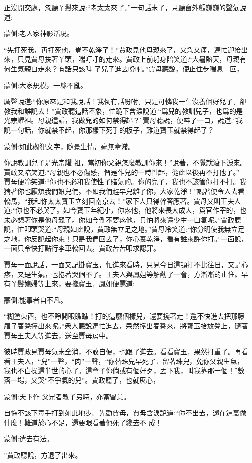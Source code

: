 \begin{parag}
    正沒開交處，忽聽丫鬟來說:“老太太來了。”一句話未了，只聽窗外顫巍巍的聲氣說道:\begin{note}蒙側:老人家神影活現。\end{note}“先打死我，再打死他，豈不乾淨了！”賈政見他母親來了，又急又痛，連忙迎接出來，只見賈母扶著丫頭，喘吁吁的走來。賈政上前躬身陪笑道:“大暑熱天，母親有何生氣親自走來？有話只該叫 了兒子進去吩咐。”賈母聽說，便止住步喘息一回，\begin{note}蒙側:大家規模，一絲不亂。\end{note}厲聲說道:“你原來是和我說話！我倒有話吩咐，只是可憐我一生沒養個好兒子，卻教我和誰說去！”賈政聽這話不象，忙跪下含淚說道:“爲兒的教訓兒子，也爲的是光宗耀祖。母親這話，我做兒的如何禁得起？”賈母聽說，便啐了一口，說道:“我說一句話，你就禁不起，你那樣下死手的板子，難道寶玉就禁得起了？\begin{note}蒙側:如此礙犯文字，隨景生情，毫無牽滯。\end{note}你說教訓兒子是光宗耀 祖，當初你父親怎麼教訓你來！”說著，不覺就滾下淚來。賈政又陪笑道:“母親也不必傷感，皆是作兒的一時性起，從此以後再不打他了。” 賈母便冷笑道:“你也不必和我使性子賭氣的。你的兒子，我也不該管你打不打。我猜著你也厭煩我們娘兒們。不如我們趕早兒離了你，大家乾淨！”說著便令人去看轎馬，“我和你太太寶玉立刻回南京去！”家下人只得幹答應著。賈母又叫王夫人道:“你也不必哭了。如今寶玉年紀小，你疼他，他將來長大成人，爲官作宰的，也未必想著你是他母親了。你如今倒不要疼他，只怕將來還少生一口氣呢。”賈政聽說，忙叩頭哭道:“母親如此說，賈政無立足之地。”賈母冷笑道:“你分明使我無立足之地，你反說起你來！只是我們回去了，你心裏乾淨，看有誰來許你打。”一面說，一面只令快打點行李車轎回去。賈政苦苦叩求認罪。
\end{parag}


\begin{parag}
    賈母一面說話，一面又記掛寶玉，忙進來看時，只見今日這頓打不比往日，又是心疼，又是生氣，也抱著哭個不了。王夫人與鳳姐等解勸了一會，方漸漸的止住。早有丫鬟媳婦等上來，要攙寶玉，鳳姐便罵道:\begin{note}蒙側:能事者自不凡。\end{note}“糊塗東西，也不睜開眼瞧瞧！打的這麼個樣兒，還要攙著走！還不快進去把那藤 屜子春凳擡出來呢。”衆人聽說連忙進去，果然擡出春凳來，將寶玉抬放凳上，隨著賈母王夫人等進去，送至賈母房中。
\end{parag}


\begin{parag}
    彼時賈政見賈母氣未全消，不敢自便，也跟了進去。看看寶玉，果然打重了。再看看王夫人，“兒”一聲，“肉”一聲，“你替珠兒早死了，留著珠兒，免你父親生氣，我也不白操這半世的心了。這會子你倘或有個好歹，丟下我，叫我靠那一個！”數落一場，又哭“不爭氣的兒”。賈政聽了，也就灰心，\begin{note}蒙側:天下作 父兄者教子弟時，亦當留意。\end{note}自悔不該下毒手打到如此地步。先勸賈母，賈母含淚說道:“你不出去，還在這裏做什麼！難道於心不足，還要眼看著他死了纔去不 成！\begin{note}蒙側:遣去有法。\end{note}”賈政聽說，方退了出來。
\end{parag}


